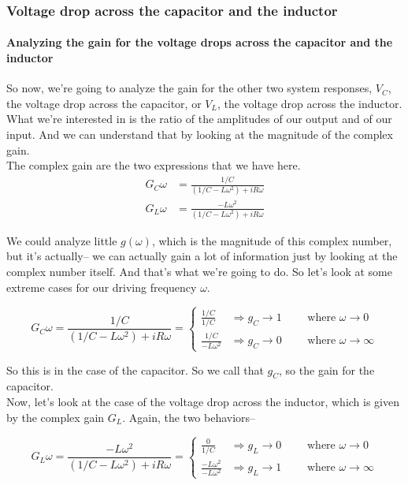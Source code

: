 \subsubsection{Voltage drop across the capacitor and the inductor}
\paragraph{Analyzing the gain for the voltage drops across the capacitor and the inductor}
So now, we're going to analyze the gain for the other two
system responses, $V _C$, the voltage drop
across the capacitor, or $V _L$, the voltage drop
across the inductor.\\


What we're interested in is the ratio of the amplitudes
of our output and of our input.
And we can understand that by looking at the magnitude
of the complex gain.\\
The complex gain are the two expressions that we have here.
\begin{align*}
  G _C{\omega} &= \frac{1/C}{(1/C - L\omega ^2) + iR \omega} \\
  G _L{\omega} &= \frac{-L \omega ^2}{(1/C - L\omega ^2) + iR \omega} 
\end{align*}

We could analyze little $g (\omega)$, which is
the magnitude of this complex number, but it's actually-- we
can actually gain a lot of information
just by looking at the complex number itself.
And that's what we're going to do.
So let's look at some extreme cases for our driving frequency $\omega$.

\begin{equation*}
  G _C{\omega} = \frac{1/C}{(1/C - L\omega ^2) + iR \omega} =
  \begin{cases}
    \frac{1/C}{1/C} &\Rightarrow  g _C \to 1 \qquad \text{ where }\omega \to 0 \\
    \frac{1/C}{-L \omega^2} &\Rightarrow  g _C \to 0 \qquad \text{ where } \omega \to \infty
  \end{cases}
\end{equation*}

So this is in the case of the capacitor.
So we call that $g _C$, so the gain for the capacitor.\\

Now, let's look at the case of the voltage drop
across the inductor, which is given by the complex gain $G _L$.
Again, the two behaviors--

\begin{equation*}
  G _L{\omega} = \frac{-L \omega ^2}{(1/C - L\omega ^2) + iR \omega}  =
  \begin{cases}
    \frac{0}{1/C} &\Rightarrow  g _L \to 0 \qquad \text{ where }\omega \to 0 \\
    \frac{-L \omega ^2}{-L \omega^2} &\Rightarrow  g _L \to 1 \qquad \text{ where } \omega \to \infty
  \end{cases}
\end{equation*}

